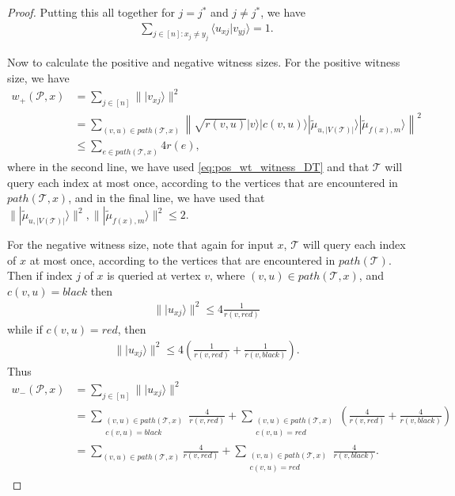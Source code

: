 \documentclass[cleveref, autoref, thm-restate,11pt]{article}
\theoremstyle{definition}
\newcommand{\sop}[1]{{\mathcal #1}}
\newcommand{\ket}[1]{|#1\rangle}
\newcommand{\braket}[2]{\langle{#1}|{#2}\rangle}
\renewcommand{\wp}[2]{{w_+({#1},{#2})}}
\newcommand{\wm}[2]{{w_-({#1},{#2})}}
\begin{document}
\begin{proof}
Putting this all together for $j=j^*$ and $j\neq j^*$, we have 
\begin{align}
\sum_{j\in [n]:x_j\neq y_j}\braket{u_{xj}}{v_{yj}}=1.
\end{align}

Now to calculate the positive and negative witness sizes. For the positive witness
size, we have
\begin{align}
\wp{\mathscr P}{x}&=\sum_{j\in[n]}\|\ket{v_{xj}}\|^2\nonumber\\
&=\sum_{(v,u)\in path(\sop T, x)}\left\|\sqrt{r(v,u)}\ket{v}\ket{c(v,u)}\ket{\tilde{\mu}_{u,|V(\sop T)|}}\ket{\tilde{\mu}_{f(x),m}}\right\|^2\nonumber\\
&\leq \sum_{e\in path(\sop T, x)}4 r(e),
\end{align}
where in the second line, 
we have used \cref{eq:pos_wt_witness_DT} and that $\sop T$ will query each index at most once,
according to the vertices that are encountered in $path(\sop T,x)$,
and in the final line, we have used that $\|\ket{\tilde{\mu}_{u,|V(\sop T)|}}\|^2,\|\ket{\tilde{\mu}_{f(x),m}}\|^2\leq 2.$

For the negative witness size, note that again for input $x$,
$\sop T$ will query each index of $x$ at most once, according to the 
vertices that are encountered in $path(\sop T)$. Then if index $j$ of $x$ is queried 
at vertex $v$, where $(v,u)\in path(\sop T,x)$, and $c(v,u)=black$ then 
\begin{align}
\|\ket{u_{xj}}\|^2\leq 4\frac{1}{r(v,red)}
\end{align}
while if $c(v,u)=red$, then
\begin{align}
\|\ket{u_{xj}}\|^2\leq 4\left(\frac{1}{r(v,red)}+\frac{1}{r(v,black)}\right).
\end{align}
Thus
\begin{align}
\wm{\mathscr P}{x}&=\sum_{j\in[n]}\|\ket{u_{xj}}\|^2\nonumber\\
&=\sum_{\substack{(v,u)\in path(\sop T,x)\\
c(v,u)=black}}\frac{4}{r(v,red)}
+\sum_{\substack{(v,u)\in path(\sop T,x)\\
c(v,u)=red}}\left(\frac{4}{r(v,red)}+\frac{4}{r(v,black)}\right)\nonumber\\
&=\sum_{(v,u)\in path(\sop T,x)}\frac{4}{r(v,red)}
+\sum_{\substack{(v,u)\in path(\sop T,x)\\
c(v,u)=red}}\frac{4}{r(v,black)}.
\end{align}
\end{proof}
\end{document}
